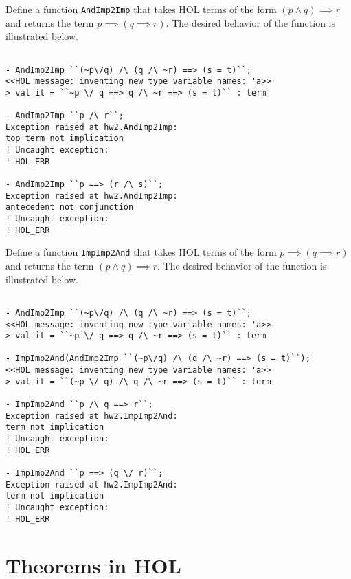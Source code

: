 \begin{exercise}[\synthesis]
Define a function \texttt{AndImp2Imp} that takes HOL terms of the form
$(p \wedge q) \implies r$ and returns the term $p \implies (q \implies
r)$. The desired behavior of the function is illustrated below.
\begin{session}
\begin{verbatim}

- AndImp2Imp ``(~p\/q) /\ (q /\ ~r) ==> (s = t)``;
<<HOL message: inventing new type variable names: 'a>>
> val it = ``~p \/ q ==> q /\ ~r ==> (s = t)`` : term

- AndImp2Imp ``p /\ r``;
Exception raised at hw2.AndImp2Imp:
top term not implication
! Uncaught exception: 
! HOL_ERR

- AndImp2Imp ``p ==> (r /\ s)``;
Exception raised at hw2.AndImp2Imp:
antecedent not conjunction
! Uncaught exception: 
! HOL_ERR
\end{verbatim}
\end{session}
  
\end{exercise}

\begin{exercise}[\synthesis]
Define a function \texttt{ImpImp2And} that takes HOL terms of the form
$p \implies (q \implies r)$ and returns the term $(p \wedge q)
\implies r$. The desired behavior of the function is illustrated below.
\begin{session}
\begin{verbatim}

- AndImp2Imp ``(~p\/q) /\ (q /\ ~r) ==> (s = t)``;
<<HOL message: inventing new type variable names: 'a>>
> val it = ``~p \/ q ==> q /\ ~r ==> (s = t)`` : term

- ImpImp2And(AndImp2Imp ``(~p\/q) /\ (q /\ ~r) ==> (s = t)``);
<<HOL message: inventing new type variable names: 'a>>
> val it = ``(~p \/ q) /\ q /\ ~r ==> (s = t)`` : term

- ImpImp2And ``p /\ q ==> r``;
Exception raised at hw2.ImpImp2And:
term not implication
! Uncaught exception: 
! HOL_ERR

- ImpImp2And ``p ==> (q \/ r)``;
Exception raised at hw2.ImpImp2And:
term not implication
! Uncaught exception: 
! HOL_ERR
\end{verbatim}
\end{session}
  
\end{exercise}

\section{Theorems in HOL}
\label{sec:theorems-hol}

